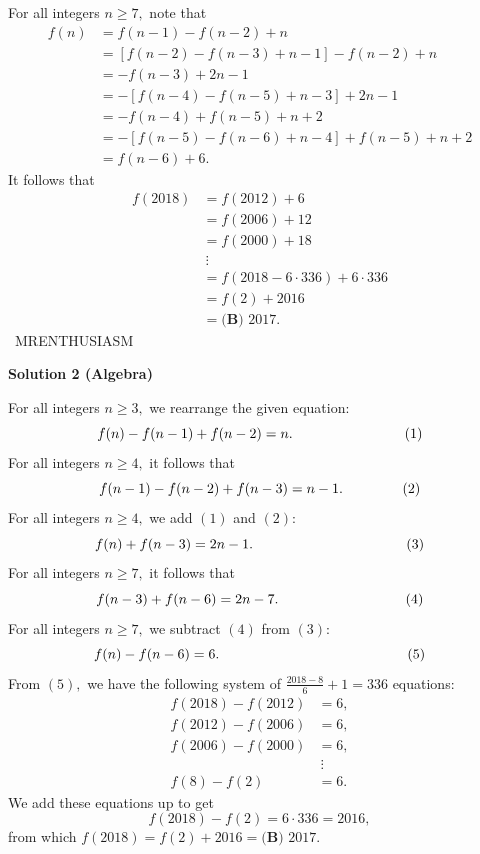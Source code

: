 \begin{enumerate}
For all integers $n \geq 7,$ note that
 \begin{align*} f(n)&=f(n-1)-f(n-2)+n \\ &=[f(n-2)-f(n-3)+n-1]-f(n-2)+n \\ &=-f(n-3)+2n-1 \\ &=-[f(n-4)-f(n-5)+n-3]+2n-1 \\ &=-f(n-4)+f(n-5)+n+2 \\ &=-[f(n-5)-f(n-6)+n-4]+f(n-5)+n+2 \\ &=f(n-6)+6. \end{align*}
It follows that
 \begin{align*} f(2018)&=f(2012)+6 \\ &=f(2006)+12 \\ &=f(2000)+18 \\ & \ \vdots \\ &=f(2018-6\cdot336)+6\cdot336 \\ &=f(2)+2016 \\ &=\boxed{\textbf{(B) } 2017}. \end{align*}
~MRENTHUSIASM

 



\textbf{Solution 2 (Algebra)}

For all integers $n\geq3,$ we rearrange the given equation: 
 \[f(n)-f(n-1)+f(n-2)=n. \hspace{28.25mm}(1)\]For all integers $n\geq4,$ it follows that 
 \[f(n-1)-f(n-2)+f(n-3)=n-1. \hspace{15mm}(2)\]For all integers $n\geq4,$ we add $(1)$ and $(2):$ 
 \[f(n)+f(n-3)=2n-1. \hspace{38.625mm}(3)\]For all integers $n\geq7,$ it follows that 
 \[f(n-3)+f(n-6)=2n-7. \hspace{32mm}(4)\]For all integers $n\geq7,$ we subtract $(4)$ from $(3):$ 
 \[f(n)-f(n-6)=6. \hspace{47.5mm}(5)\]From $(5),$ we have the following system of $\frac{2018-8}{6}+1=336$ equations:
 \begin{align*} f(2018)-f(2012)&=6, \\ f(2012)-f(2006)&=6, \\ f(2006)-f(2000)&=6, \\ & \ \vdots \\ f(8)-f(2)&=6. \end{align*}
We add these equations up to get 
 \[f(2018)-f(2)=6\cdot336=2016,\] from which $f(2018)=f(2)+2016=\boxed{\textbf{(B) } 2017}.$





\end{enumerate}
